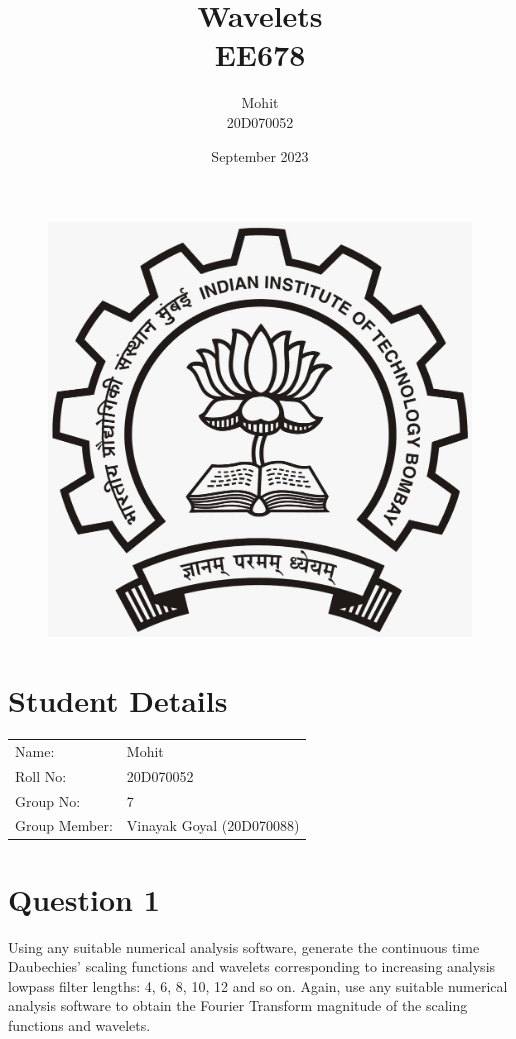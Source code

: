 \documentclass{article}
\title{Wavelets \\EE678}
\author{Mohit\\20D070052 }
\date{September 2023}
\begin{document}
\maketitle
\begin{figure}[H]
\begin{center}
\includegraphics[scale = 0.2]{LOGO.jpeg}
\end{center}
\end{figure}
\section{Student Details}
\begin{tabular}{ l l  }
 Name: & Mohit \\ 
 Roll No: & 20D070052  \\  
 Group No: &7\\
 Group Member: & Vinayak Goyal (20D070088)
\end{tabular}

\newpage

\section{Question 1}
Using any suitable numerical analysis software, generate the continuous time Daubechies' scaling functions and wavelets corresponding to increasing analysis lowpass filter lengths: 4, 6, 8, 10, 12 and so on. Again, use any suitable numerical analysis software to obtain the Fourier Transform magnitude of the scaling functions and wavelets.
\end{document}
